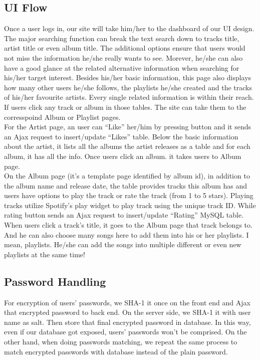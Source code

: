 \documentclass[letterpaper, 12pt]{report}
\begin{document}
	\subsection{UI Flow}
	Once a user logs in, our site will take him/her to the dashboard of our UI design. The major searching function can break the text search down to tracks title, artist title or even album title. The additional options ensure that users would not miss the information he/she really wants to see. Morever, he/she can also have a good glance at the related alternative information when searching for his/her target interest. Besides his/her basic information, this page also displays how many other users he/she follows, the playlists he/she created and the tracks of his/her favourite artists. Every single related information is within their reach. If users click any track or album in those tables. The site can take them to the corresspoind Album or Playlist pages.\\
	For the Artist page, an user can “Like” her/him by pressing button and it sends an Ajax request to insert/update “Likes” table. Below the basic information about the artist, it lists all the albums the artist releases as a table and for each album, it has all the info. Once users click an album. it takes users to Album page. \\
	On the Album page (it’s a template page identified by album id), in addition to the album name and release date, the table provides tracks this album has and users have options to play the track or rate the track (from 1 to 5 stars). Playing tracks utilize Spotify’s play widget to play track using the unique track ID. While rating button sends an Ajax request to insert/update “Rating” MySQL table. When users click a track’s title, it goes to the Album page that track belongs to. And he can also choose many songs here to add them into his or her playlists. I mean, playlists. He/she can add the songs into multiple different or even new playlists at the same time!
	
	\subsection{Password Handling}
	For encryption of users’ passwords, we SHA-1 it once on the front end and Ajax that encrypted password to back end. On the server side, we SHA-1 it with user name as salt. Then store that final encrypted password in database. In this way, even if our database got exposed, users’ passwords won’t be comprised. On the other hand, when doing passwords matching, we repeat the same process to match encrypted passwords with database instead of the plain password. 
	
\end{document}

